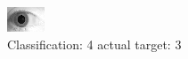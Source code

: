 \begin{figure}[h!]
\begin{center}
\includegraphics[width=0.60\columnwidth]{figures/ID1929_class_4_target_3.png}
\end{center}
\caption{ Classification: 4 actual target: 3}
\label{fig:ID1929_class_4_target_3}
\end{figure}
